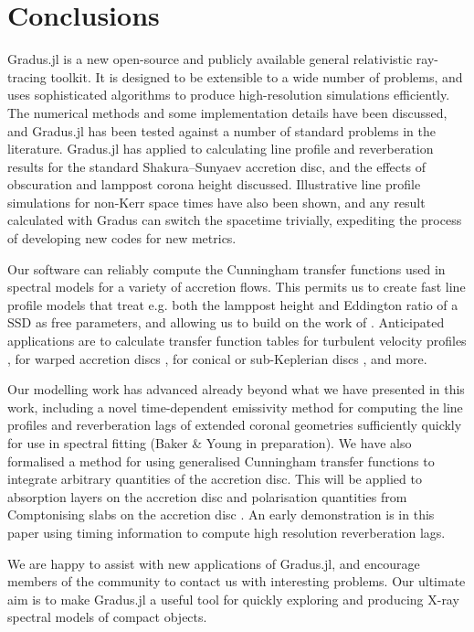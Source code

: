 \documentclass[fleqn,usenatbib]{mnras}
\newcommand{\software}[1]{{\sc #1}}
\newcommand{\Gradus}{\software{Gradus.jl}\xspace}
\begin{document}
\section{Conclusions}
\label{sec:conclusion}

\Gradus is a new open-source and publicly available general relativistic
ray-tracing toolkit. It is designed to be extensible to a wide number of
problems, and uses sophisticated algorithms to produce high-resolution
simulations efficiently. The numerical methods and some implementation details
have been discussed, and \Gradus has been tested against a number of standard
problems in the literature. \Gradus has applied to calculating line profile and
reverberation results for the standard Shakura--Sunyaev accretion disc, and the
effects of obscuration and lamppost corona height discussed. Illustrative line
profile simulations for non-Kerr space times have also been shown, and any
result calculated with Gradus can switch the spacetime trivially, expediting
the process of developing new codes for new metrics.

Our software can reliably compute the Cunningham transfer functions used in
spectral models for a variety of accretion flows. This permits us to create fast
line profile models that treat e.g. both the lamppost height and Eddington
ratio of a SSD as free parameters, and allowing us to build on the work of
\citet{jiang_black_20222}. Anticipated applications are to calculate
transfer function tables for turbulent velocity profiles
\citep{pariev_line_1998}, for warped accretion discs
\citep[e.g.][]{hartnoll_reprocessed_2001}, for conical or sub-Keplerian discs
\citep[e.g.][]{wu_iron_2007}, and more.

Our modelling work has advanced already beyond what we have presented in this
work, including a novel time-dependent emissivity method for computing the line
profiles and reverberation lags of extended coronal geometries sufficiently
quickly for use in spectral fitting (Baker \& Young in preparation). We have
also formalised a method for using generalised Cunningham transfer functions to
integrate arbitrary quantities of the accretion disc. This will be applied to
absorption layers on the accretion disc \citep{fabian_blueshifted_2020} and
polarisation quantities from Comptonising slabs on the accretion disc
\citep[e.g.][]{poutanen_the_1996}. An early demonstration is in this paper using
timing information to compute high resolution reverberation lags.

We are happy to assist with new applications of \Gradus, and encourage members
of the community to contact us with interesting problems. Our ultimate aim is to
make \Gradus a useful tool for quickly exploring and producing X-ray spectral
models of compact objects.
\end{document}
